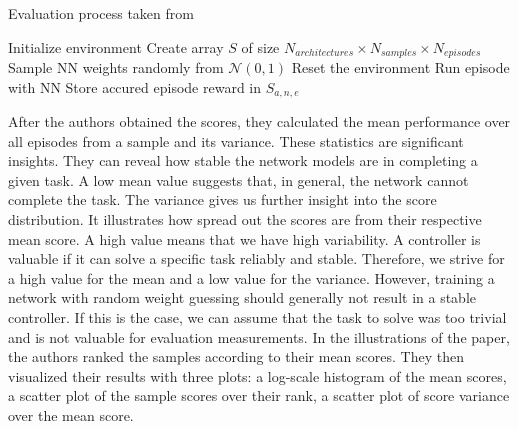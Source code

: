 \begin{algorithm}
\caption{Evaluation process taken from \citet{oller_analyzing_2020}}
\begin{algorithmic}[1]
\State Initialize environment
\State Create array $S$ of size $N_{architectures} \times N_{samples} \times N_{episodes}$
    \State Sample NN weights randomly from $\mathcal{N}(0,1)$
      \State Reset the environment
      \State Run episode with NN
      \State Store accured episode reward in $S_{a,n,e}$
    \EndFor
\EndFor
\end{algorithmic}
\label{alg:environment-evaluation}
\end{algorithm}

After the authors obtained the scores, they calculated the mean performance over all episodes from a sample and its variance. These statistics are significant insights. They can reveal how stable the network models are in completing a given task. A low mean value suggests that, in general, the network cannot complete the task. The variance gives us further insight into the score distribution. It illustrates how spread out the scores are from their respective mean score. A high value means that we have high variability. A controller is valuable if it can solve a specific task reliably and stable. Therefore, we strive for a high value for the mean and a low value for the variance. However, training a network with random weight guessing should generally not result in a stable controller. If this is the case, we can assume that the task to solve was too trivial and is not valuable for evaluation measurements. In the illustrations of the paper, the authors ranked the samples according to their mean scores. They then visualized their results with three plots: a log-scale histogram of the mean scores, a scatter plot of the sample scores over their rank, a scatter plot of score variance over the mean score.

